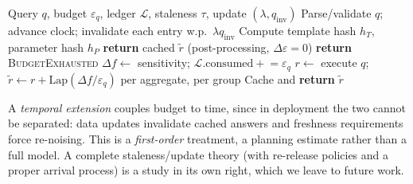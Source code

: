 \documentclass[sigconf,nonacm]{acmart}
\newcommand{\eps}{\varepsilon}
\newcommand{\Lap}{\mathrm{Lap}}
\begin{document}
\begin{algorithm}[t]
\caption{Workload-aware DP middleware (one query).}
\label{alg:full}
\begin{algorithmic}[1]
\REQUIRE Query $q$, budget $\eps_q$, ledger $\mathcal L$, staleness $\tau$, update $(\lambda,q_{\mathrm{inv}})$
\STATE Parse/validate $q$; advance clock; invalidate each entry w.p.\ $\lambda q_{\mathrm{inv}}$
\STATE Compute template hash $h_T$, parameter hash $h_P$
 \STATE \textbf{return} cached $\tilde r$ \hfill {\small (post-processing, $\Delta\eps{=}0$)}
\ENDIF
\IF{$\mathcal L.\mathrm{remaining}<\eps_q$} \STATE \textbf{return} \textsc{BudgetExhausted} \ENDIF
\STATE $\Delta f\gets$ sensitivity; $\mathcal L.\mathrm{consumed}\mathrel{+}=\eps_q$
\STATE $r\gets$ execute $q$; $\tilde r\gets r+\Lap(\Delta f/\eps_q)$ per aggregate, per group
\STATE Cache and \textbf{return} $\tilde r$
\end{algorithmic}
\end{algorithm}

A \emph{temporal extension} couples budget to time, since in deployment the two cannot be separated: data updates invalidate cached answers and freshness requirements force re-noising. This is a \emph{first-order} treatment, a planning estimate rather than a full model. A complete staleness/update theory (with re-release policies and a proper arrival process) is a study in its own right, which we leave to future work.
\end{document}
